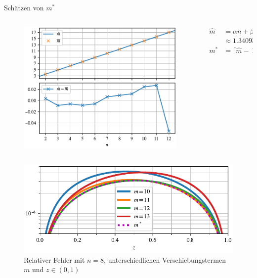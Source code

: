 \begin{frame}{Schätzen von $m^*$}
\begin{columns}
\begin{column}{0.65\textwidth}
\begin{figure}
\centering
\vspace{-12pt}
\includegraphics[width=1.0\textwidth]{../images/estimates.pdf}
\end{figure}
\end{column}
\begin{column}{0.34\textwidth}
\begin{align*}
\hat{m}
&=
\alpha n + \beta
\\
&\approx
1.34093 n + 0.854093
\\
m^*
&=
\lceil \hat{m} - \operatorname{Re}z \rceil
\end{align*}
\end{column}
\end{columns}

\end{frame}

\begin{frame}{}
\begin{figure}[h]
\centering
\includegraphics{../images/rel_error_shifted.pdf}
\caption{Relativer Fehler mit $n=8$, unterschiedlichen Verschiebungstermen $m$ und $z\in(0, 1)$}
\end{figure}
\end{frame}

